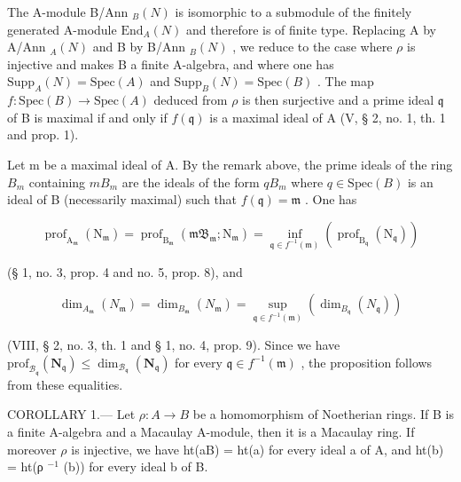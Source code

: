 The A-module B/Ann \(_B(N)\) is isomorphic to a submodule of the finitely generated A-module \(\text{End}_A(N)\) and therefore is of finite type. Replacing A by A/Ann \(_A(N)\) and B by B/Ann \(_B(N)\) , we reduce to the case where \(\rho\) is injective and makes B a finite A-algebra, and where one has \(\text{Supp}_A(N) = \text{Spec}(A)\) and \(\text{Supp}_B(N) = \text{Spec}(B)\) . The map \(f: \text{Spec}(B) \to \text{Spec}(A)\) deduced from \(\rho\) is then surjective and a prime ideal \(\mathfrak{q}\) of B is maximal if and only if \(f(\mathfrak{q})\) is a maximal ideal of A (V, § 2, no. 1, th. 1 and prop. 1).

Let m be a maximal ideal of A. By the remark above, the prime ideals of the ring \(B_{m}\) containing \(mB_{m}\) are the ideals of the form \(qB_{m}\) where \(q \in \text{Spec}(B)\) is an ideal of B (necessarily maximal) such that \(f(\mathfrak{q}) = \mathfrak{m}\) . One has

\[
\operatorname{prof} _ {\mathrm{A} _ {\mathfrak {m}}} \left(\mathrm{N} _ {\mathfrak {m}}\right) = \operatorname{prof} _ {\mathrm{B} _ {\mathfrak {m}}} \left(\mathfrak {m B} _ {\mathfrak {m}}; \mathrm{N} _ {\mathfrak {m}}\right) = \inf _ {\mathfrak {q} \in f ^ {- 1} (\mathfrak {m})} \left(\operatorname{prof} _ {\mathrm{B} _ {\mathfrak {q}}} \left(\mathrm{N} _ {\mathfrak {q}}\right)\right)
\]

(§ 1, no. 3, prop. 4 and no. 5, prop. 8), and

\[
\dim_ {A _ {\mathfrak {m}}} \left(N _ {\mathfrak {m}}\right) = \dim_ {B _ {\mathfrak {m}}} \left(N _ {\mathfrak {m}}\right) = \sup _ {\mathfrak {q} \in f ^ {- 1} (\mathfrak {m})} \left(\dim_ {B _ {\mathfrak {q}}} \left(N _ {\mathfrak {q}}\right)\right)
\]

(VIII, § 2, no. 3, th. 1 and § 1, no. 4, prop. 9). Since we have \(\mathrm{prof}_{\mathcal{B}_{\mathfrak{q}}}(\mathbf{N}_{\mathfrak{q}}) \leqslant \dim_{\mathcal{B}_{\mathfrak{q}}}(\mathbf{N}_{\mathfrak{q}})\) for every \(\mathfrak{q} \in f^{-1}(\mathfrak{m})\) , the proposition follows from these equalities.

COROLLARY 1.--- Let \(\rho: A \to B\) be a homomorphism of Noetherian rings. If B is a finite A-algebra and a Macaulay A-module, then it is a Macaulay ring. If moreover \(\rho\) is injective, we have ht(aB) = ht(a) for every ideal a of A, and ht(b) = ht(ρ \(^{-1}\) (b)) for every ideal b of B.

